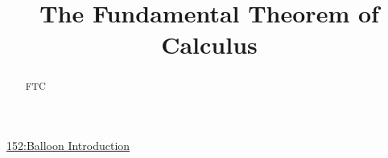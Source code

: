 \documentclass{ximera}
\title{The Fundamental Theorem of Calculus}
\begin{document}
\begin{abstract}
FTC
\end{abstract}
\maketitle



\begin{onlineOnly}
    \begin{center}
\end{center}
\end{onlineOnly}

\href{https://www.desmos.com/calculator/tgi5yiuzab}{152:Balloon Introduction}
\end{document}
